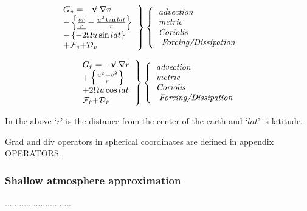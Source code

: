 \begin{equation}
\left. 
\begin{tabular}{l}
$G_{v}=-\vec{\mathbf{v}}.\nabla v$ \\ 
$-\left\{ \underline{\frac{v\dot{r}}{{r}}}-\frac{u^{2}\tan lat}{{r}%
}\right\} $ \\ 
$-\left\{ -2\Omega u\sin lat\right\} $ \\ 
$+\mathcal{F}_{v}\mathcal{+D}_{v}$%
\end{tabular}
\right\} \left\{ 
\begin{tabular}{l}
\textit{advection} \\ 
\textit{metric} \\ 
\textit{Coriolis} \\ 
\textit{\ Forcing/Dissipation}
\end{tabular}
\right. \qquad  \label{eq:gv-spherical}
\end{equation}
\qquad \qquad \qquad \qquad \qquad

\begin{equation}
\left. 
\begin{tabular}{l}
$G_{\dot{r}}=-\vec{\mathbf{v}}.\nabla \dot{r}$ \\ 
$+\left\{ \frac{u^{_{^{2}}}+v^{2}}{{{r}}}%
\right\} $ \\ 
${+2\Omega u\cos lat}$ \\ 
$\mathcal{F}_{\dot{r}}\mathcal{+D}_{\dot{r}}$%
\end{tabular}
\right\} \left\{ 
\begin{tabular}{l}
\textit{advection} \\ 
\textit{metric} \\ 
\textit{Coriolis} \\ 
\textit{\ Forcing/Dissipation}
\end{tabular}
\right.  \label{eq:gw-spherical}
\end{equation}
\qquad \qquad \qquad \qquad \qquad

In the above `${r}$' is the distance from the center of the earth and `$%
lat$' is latitude.

Grad and div operators in spherical coordinates are defined in appendix
OPERATORS.%

\subsubsection{Shallow atmosphere approximation}

............................

